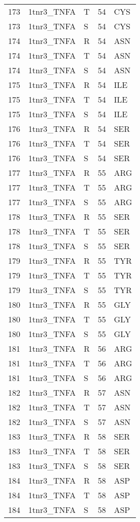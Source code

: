 \begin{longtable}[l]{l|l|l|l|l}
	173 & 1tnr3_TNFA & T & 54 & CYS \\
	173 & 1tnr3_TNFA & S & 54 & CYS \\
	174 & 1tnr3_TNFA & R & 54 & ASN \\
	174 & 1tnr3_TNFA & T & 54 & ASN \\
	174 & 1tnr3_TNFA & S & 54 & ASN \\
	175 & 1tnr3_TNFA & R & 54 & ILE \\
	175 & 1tnr3_TNFA & T & 54 & ILE \\
	175 & 1tnr3_TNFA & S & 54 & ILE \\
	176 & 1tnr3_TNFA & R & 54 & SER \\
	176 & 1tnr3_TNFA & T & 54 & SER \\
	176 & 1tnr3_TNFA & S & 54 & SER \\
	177 & 1tnr3_TNFA & R & 55 & ARG \\
	177 & 1tnr3_TNFA & T & 55 & ARG \\
	177 & 1tnr3_TNFA & S & 55 & ARG \\
	178 & 1tnr3_TNFA & R & 55 & SER \\
	178 & 1tnr3_TNFA & T & 55 & SER \\
	178 & 1tnr3_TNFA & S & 55 & SER \\
	179 & 1tnr3_TNFA & R & 55 & TYR \\
	179 & 1tnr3_TNFA & T & 55 & TYR \\
	179 & 1tnr3_TNFA & S & 55 & TYR \\
	180 & 1tnr3_TNFA & R & 55 & GLY \\
	180 & 1tnr3_TNFA & T & 55 & GLY \\
	180 & 1tnr3_TNFA & S & 55 & GLY \\
	181 & 1tnr3_TNFA & R & 56 & ARG \\
	181 & 1tnr3_TNFA & T & 56 & ARG \\
	181 & 1tnr3_TNFA & S & 56 & ARG \\
	182 & 1tnr3_TNFA & R & 57 & ASN \\
	182 & 1tnr3_TNFA & T & 57 & ASN \\
	182 & 1tnr3_TNFA & S & 57 & ASN \\
	183 & 1tnr3_TNFA & R & 58 & SER \\
	183 & 1tnr3_TNFA & T & 58 & SER \\
	183 & 1tnr3_TNFA & S & 58 & SER \\
	184 & 1tnr3_TNFA & R & 58 & ASP \\
	184 & 1tnr3_TNFA & T & 58 & ASP \\
	184 & 1tnr3_TNFA & S & 58 & ASP \\

\end{longtable}
